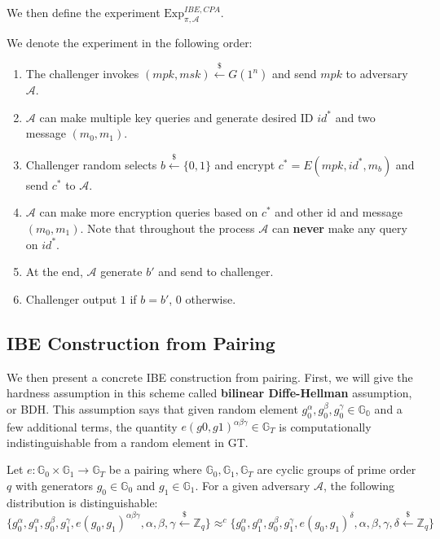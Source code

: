 We then define the experiment $\text{Exp}_{\pi,\mathcal{A}}^{IBE,CPA}$.
\begin{definition}
We denote the experiment in the following order: 
\begin{enumerate}
    \item The challenger invokes $(mpk, msk)\stackrel{\$}{\gets} G(1^n)$ and send $mpk$ to adversary $\mathcal{A}$.
    \item $\mathcal{A}$ can make multiple key queries and generate desired ID $id^{*}$ and two message $(m_0, m_1)$. 
    \item Challenger random selects $b\stackrel{\$}{\gets}\{0,1\}$ and encrypt $c^{*}=E(mpk, id^{*},m_b)$ and send $c^{*}$ to $\mathcal{A}$.
    \item $\mathcal{A}$ can make more encryption queries based on $c^{*}$ and other id and message $(m_0,m_1)$. Note that throughout the process $\mathcal{A}$ can \textbf{never} make any query on $id^{*}$. 
    \item At the end, $\mathcal{A}$ generate $b'$ and send to challenger. 
    \item Challenger output $1$ if $b=b'$, $0$ otherwise. 
\end{enumerate}
\end{definition}

\subsection{IBE Construction from Pairing}
We then present a concrete IBE construction from pairing.
First, we will give the hardness assumption in this scheme called \textbf{bilinear Diffe-Hellman} assumption, or BDH. 
This assumption says that given random element $g_0^{\alpha},g_0^{\beta},g_0^{\gamma}\in\mathbb{G_0}$ and a few additional terms, the quantity $e(g0,g1)^{\alpha\beta\gamma}\in\mathbb{G}_T$ is computationally indistinguishable from a random element in GT.

\begin{definition}
    Let $e: \mathbb{G}_0\times\mathbb{G}_1\rightarrow\mathbb{G}_T$ be a pairing where $\mathbb{G}_0,\mathbb{G}_1,\mathbb{G}_T$ are cyclic groups of prime order $q$ with generators $g_0 \in \mathbb{G}_0$ and $g_1 \in \mathbb{G}_1$. For a given adversary $\mathcal{A}$, the following distribution is distinguishable: 
    \[
    \{g_0^{\alpha},g_1^{\alpha},g_0^{\beta},g_1^{\gamma},e(g_0,g_1)^{\alpha\beta\gamma},  \alpha,\beta,\gamma\stackrel{\$}{\gets}\mathbb{Z}_q\} \approx^{c}
    \{g_0^{\alpha},g_1^{\alpha},g_0^{\beta},g_1^{\gamma},e(g_0,g_1)^{\delta},  \alpha,\beta,\gamma,\delta\stackrel{\$}{\gets}\mathbb{Z}_q\}
    \]
\end{definition}

